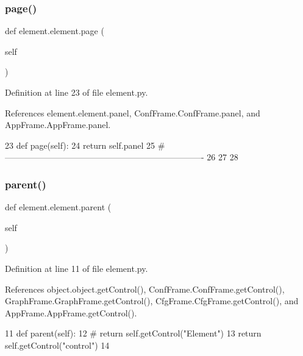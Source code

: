 \subsubsection{\texorpdfstring{page()}{page()}}
{\footnotesize\ttfamily def element.\+element.\+page (\begin{DoxyParamCaption}\item[{}]{self }\end{DoxyParamCaption})}



Definition at line 23 of file element.\+py.



References element.\+element.\+panel, Conf\+Frame.\+Conf\+Frame.\+panel, and App\+Frame.\+App\+Frame.\+panel.


\begin{DoxyCode}
23     \textcolor{keyword}{def }page(self):
24         \textcolor{keywordflow}{return} self.panel
25 \textcolor{comment}{#----------------------------------------------------------------------}
26 
27     
28 \end{DoxyCode}
\mbox{\label{classelement_1_1element_a2705e2b608db596bedf2a206bda42d12}} 
\subsubsection{\texorpdfstring{parent()}{parent()}}
{\footnotesize\ttfamily def element.\+element.\+parent (\begin{DoxyParamCaption}\item[{}]{self }\end{DoxyParamCaption})}



Definition at line 11 of file element.\+py.



References object.\+object.\+get\+Control(), Conf\+Frame.\+Conf\+Frame.\+get\+Control(), Graph\+Frame.\+Graph\+Frame.\+get\+Control(), Cfg\+Frame.\+Cfg\+Frame.\+get\+Control(), and App\+Frame.\+App\+Frame.\+get\+Control().


\begin{DoxyCode}
11     \textcolor{keyword}{def }parent(self):
12 \textcolor{comment}{#        return self.getControl("Element")}
13         \textcolor{keywordflow}{return} self.getControl(\textcolor{stringliteral}{"control"})
14    
\end{DoxyCode}


